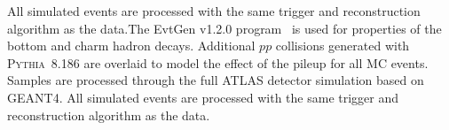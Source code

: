 All simulated events are processed with the same trigger and reconstruction algorithm as the data.The EvtGen v1.2.0 program~\cite{Lange:2001uf} is used for properties of the bottom and charm hadron decays.
Additional $pp$ collisions generated with \textsc{Pythia}~8.186\cite{Sjostrand:2008vc} are overlaid to model the effect of the pileup for all MC events.
Samples are processed through the full ATLAS detector simulation\cite{SOFT-2010-01} based on \textsc{GEANT4}\cite{Agostinelli:2002hh}.
All simulated events are processed with the same trigger and reconstruction algorithm as the data.







